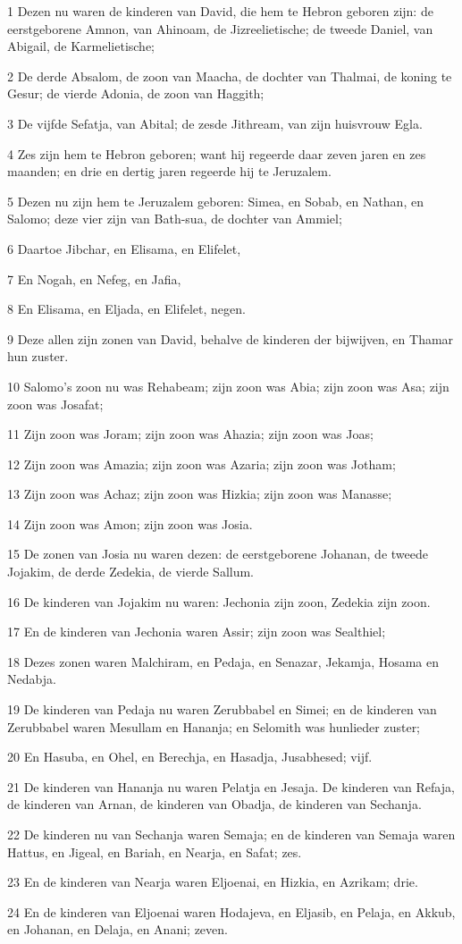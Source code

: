 \par 1 Dezen nu waren de kinderen van David, die hem te Hebron geboren zijn: de eerstgeborene Amnon, van Ahinoam, de Jizreelietische; de tweede Daniel, van Abigail, de Karmelietische;
\par 2 De derde Absalom, de zoon van Maacha, de dochter van Thalmai, de koning te Gesur; de vierde Adonia, de zoon van Haggith;
\par 3 De vijfde Sefatja, van Abital; de zesde Jithream, van zijn huisvrouw Egla.
\par 4 Zes zijn hem te Hebron geboren; want hij regeerde daar zeven jaren en zes maanden; en drie en dertig jaren regeerde hij te Jeruzalem.
\par 5 Dezen nu zijn hem te Jeruzalem geboren: Simea, en Sobab, en Nathan, en Salomo; deze vier zijn van Bath-sua, de dochter van Ammiel;
\par 6 Daartoe Jibchar, en Elisama, en Elifelet,
\par 7 En Nogah, en Nefeg, en Jafia,
\par 8 En Elisama, en Eljada, en Elifelet, negen.
\par 9 Deze allen zijn zonen van David, behalve de kinderen der bijwijven, en Thamar hun zuster.
\par 10 Salomo's zoon nu was Rehabeam; zijn zoon was Abia; zijn zoon was Asa; zijn zoon was Josafat;
\par 11 Zijn zoon was Joram; zijn zoon was Ahazia; zijn zoon was Joas;
\par 12 Zijn zoon was Amazia; zijn zoon was Azaria; zijn zoon was Jotham;
\par 13 Zijn zoon was Achaz; zijn zoon was Hizkia; zijn zoon was Manasse;
\par 14 Zijn zoon was Amon; zijn zoon was Josia.
\par 15 De zonen van Josia nu waren dezen: de eerstgeborene Johanan, de tweede Jojakim, de derde Zedekia, de vierde Sallum.
\par 16 De kinderen van Jojakim nu waren: Jechonia zijn zoon, Zedekia zijn zoon.
\par 17 En de kinderen van Jechonia waren Assir; zijn zoon was Sealthiel;
\par 18 Dezes zonen waren Malchiram, en Pedaja, en Senazar, Jekamja, Hosama en Nedabja.
\par 19 De kinderen van Pedaja nu waren Zerubbabel en Simei; en de kinderen van Zerubbabel waren Mesullam en Hananja; en Selomith was hunlieder zuster;
\par 20 En Hasuba, en Ohel, en Berechja, en Hasadja, Jusabhesed; vijf.
\par 21 De kinderen van Hananja nu waren Pelatja en Jesaja. De kinderen van Refaja, de kinderen van Arnan, de kinderen van Obadja, de kinderen van Sechanja.
\par 22 De kinderen nu van Sechanja waren Semaja; en de kinderen van Semaja waren Hattus, en Jigeal, en Bariah, en Nearja, en Safat; zes.
\par 23 En de kinderen van Nearja waren Eljoenai, en Hizkia, en Azrikam; drie.
\par 24 En de kinderen van Eljoenai waren Hodajeva, en Eljasib, en Pelaja, en Akkub, en Johanan, en Delaja, en Anani; zeven.

